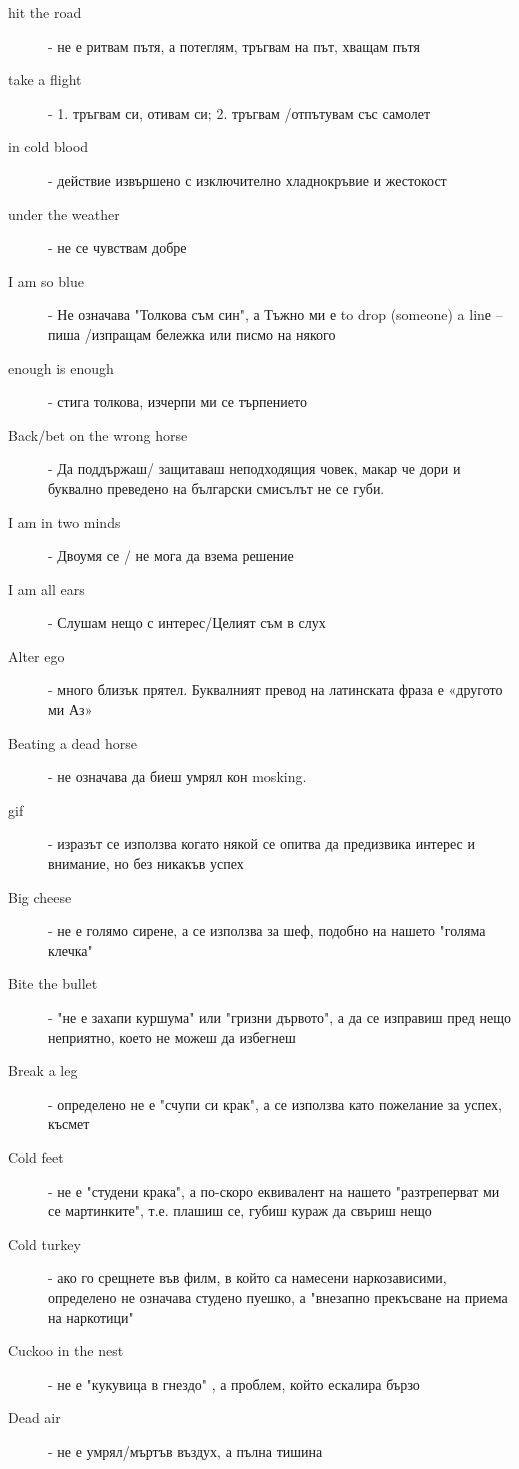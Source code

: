 \begin{description}
    \item[hit the road] - не е ритвам пътя, а потеглям, тръгвам на път, хващам пътя
    \item[take a flight] - 1. тръгвам си, отивам си; 2. тръгвам /отпътувам със самолет
    \item[in cold blood] - действие извършено с изключително хладнокръвие и жестокост
    \item[under the weather] - не се чувствам добре
    \item[I am so blue] - Не означава "Толкова съм син", а Тъжно ми е
    to drop (someone) a linе – пиша /изпращам бележка или писмо на някого
    \item[enough is enough] - стига толкова, изчерпи ми се търпението
    \item[Back/bet on the wrong horse] - Да поддържаш/ защитаваш неподходящия човек, макар че дори и буквално преведено на български смисълът не се губи.
    \item[I am in two minds] - Двоумя се / не мога да взема решение
    \item[I am all ears] - Слушам нещо с интерес/Целият съм в слух
    \item[Alter ego] - много близък прятел. Буквалният превод на латинската фраза е «другото ми Аз»
    \item[Beating a dead horse] - не означава да биеш умрял кон mosking.\item[gif] - изразът се използва когато някой се опитва да предизвика интерес и внимание, но без никакъв успех
    \item[Big cheese] - не е голямо сирене, а се използва за шеф, подобно на нашето "голяма клечка"
    \item[Bite the bullet] - "не е захапи куршума" или "гризни дървото", а да се изправиш пред нещо неприятно, което не можеш да избегнеш
    \item[Break a leg] - определено не е "счупи си крак", а се използва като пожелание за успех, късмет
    \item[Cold feet] - не е "студени крака", а по-скоро еквивалент на нашето "разтреперват ми се мартинките", т.е. плашиш се, губиш кураж да свъриш нещо
    \item[Cold turkey] - ако го срещнете във филм, в който са намесени наркозависими, определено не означава студено пуешко, а "внезапно прекъсване на приема на наркотици"
    \item[Cuckoo in the nest] - не е "кукувица в гнездо" , а проблем, който ескалира бързо
    \item[Dead air] - не е умрял/мъртъв въздух, а пълна тишина

\end{description}
